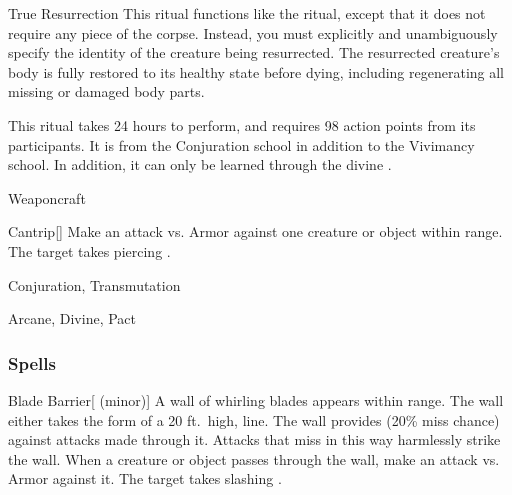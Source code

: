 \lowercase{\hypertarget{spell:True Resurrection}{}}\label{spell:True Resurrection}
\begin{ability}[\nth{7}]{\hypertarget{spell:True Resurrection}{True Resurrection}}
This ritual functions like the  ritual, except that it does not require any piece of the corpse.
Instead, you must explicitly and unambiguously specify the identity of the creature being resurrected.
The resurrected creature's body is fully restored to its healthy state before dying, including regenerating all missing or damaged body parts.

This ritual takes 24 hours to perform, and requires 98 action points from its participants.
It is from the Conjuration school in addition to the Vivimancy school.
In addition, it can only be learned through the divine .
\end{ability}
\vspace{0.25em}


\newpage
\begin{spellsection}{Weaponcraft}

\begin{spellheader}
\end{spellheader}


\begin{ability}{Cantrip}[]
Make an attack vs. Armor against one creature or object within \rngmed range.
\hit The target takes piercing .
\end{ability}




 Conjuration, Transmutation

 Arcane, Divine, Pact
\end{spellsection}


\subsubsection{Spells}


\lowercase{\hypertarget{spell:Blade Barrier}{}}\label{spell:Blade Barrier}
\begin{ability}[\nth{1}]{\hypertarget{spell:Blade Barrier}{Blade Barrier}}[ (minor)]
A wall of whirling blades appears within \rngmed range.
The wall either takes the form of a 20 ft.\ high, \arealarge line.
The wall provides  (20\% miss chance) against attacks made through it.
Attacks that miss in this way harmlessly strike the wall.
When a creature or object passes through the wall, make an attack vs. Armor against it.
\hit The target takes slashing .
\end{ability}
\vspace{0.25em}




